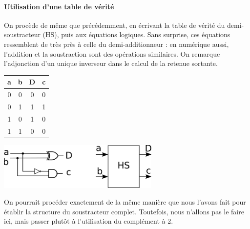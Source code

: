\paragraph{Utilisation d'une table de vérité}
On procède de même que précédemment, en écrivant la table de vérité du demi-soustracteur (HS), puis aux équations logiques. Sans surprise, ces équations
ressemblent de très près à celle du demi-additionneur : en numérique aussi, l'addition et la soustraction sont des opérations similaires.
On remarque l'adjonction d'un unique inverseur dans le calcul de la retenue sortante.
\begin{center}
   \begin{minipage}[t]{4cm}
     \vspace{0pt}
     \centering
     \begin{tabular}{|c|c||c|c|}
       \hline
       a & b & D & c \\ \hline
       0 & 0 & 0 & 0    \\ \hline
       0 & 1 & 1 & 1    \\ \hline
       1 & 0 & 1 & 0    \\ \hline
       1 & 1 & 0 & 0    \\ \hline
     \end{tabular}
   \end{minipage}%
   \begin{minipage}[t]{8cm}
     \vspace{5pt}
     \centering
     \includegraphics[width=8cm]{./figures/half_sub.png}
   \end{minipage}
\end{center} %
On pourrait procéder exactement de la même manière que nous l'avons fait pour établir la structure du soustracteur complet. Toutefois, nous n'allons pas
le faire ici, mais passer plutôt à l'utilisation du complément à 2.

